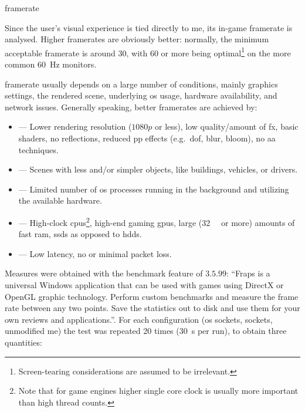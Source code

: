 \begin{definition}{framerate}
\end{definition}



Since the user's visual experience is tied directly to \gls{me}, its in-game \gls{framerate} is analysed. Higher \glspl{framerate} are obviously better: normally, the minimum acceptable \gls{framerate} is around \SI{30}{\fps}, with \SI{60}{\fps} or more being optimal\footnote{Screen-tearing considerations are assumed to be irrelevant.} on the more common \SI{60}{\hertz} monitors.

\Gls{framerate} usually depends on a large number of conditions, mainly graphics settings, the rendered scene, underlying \gls{os} usage, hardware availability, and network issues. Generally speaking, better \glspl{framerate} are achieved by:

\begin{itemize}
	\item {} --- Lower rendering resolution ($1080p$ or less), low quality/amount of \gls{fx}, basic shaders, no reflections, reduced \gls{pp} effects (e.g.\ \gls{dof}, blur, bloom), no \gls{aa} techniques.
	\item {} --- Scenes with less and/or simpler objects, like buildings, vehicles, or drivers.
	\item {} --- Limited number of \gls{os} processes running in the background and utilizing the available hardware.
	\item {} --- High-clock \glspl{cpu}\footnote{Note that for game engines higher single core clock is usually more important than high thread counts.}, high-end gaming \glspl{gpu}, large (\SI{32}{\giga\byte} or more) amounts of fast \gls{ram}, \glspl{ssd} as opposed to \glspl{hdd}.
	\item {} --- Low latency, no or minimal packet loss.
\end{itemize}

Measures were obtained with the benchmark feature of  $3.5.99$: \enquote{Fraps is a universal Windows application that can be used with games using DirectX or OpenGL graphic technology. \FONTnormal{[it can]} Perform custom benchmarks and measure the frame rate between any two points.  Save the statistics out to disk and use them for your own reviews and applications.}{\cite{performance:fraps}}. For each configuration (\gls{os} sockets,  sockets, unmodified \gls{me}) the test was repeated \num{20} times (\SI{30}{\second} per run), to obtain three quantities:

